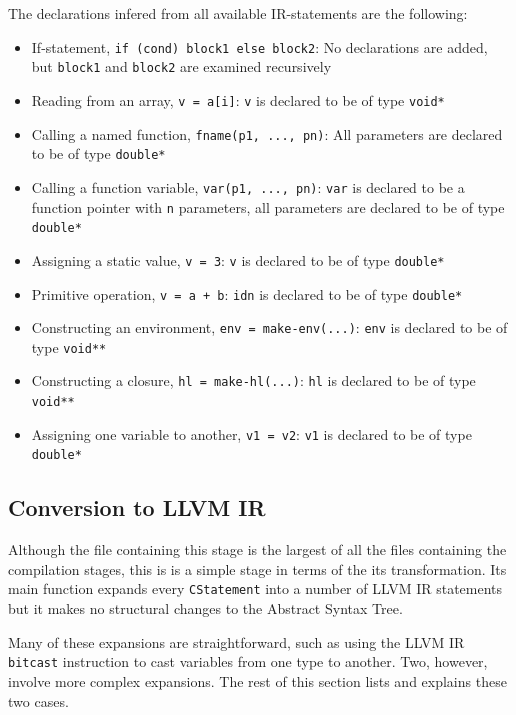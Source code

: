 \documentclass[11pt]{report}
\begin{document}
The declarations infered from all available IR-statements are the following:
\begin{itemize}
\item If-statement, \texttt{if (cond) block1 else block2}: No declarations are added, but \texttt{block1} and \texttt{block2} are examined recursively
\item Reading from an array, \texttt{v = a[i]}: \texttt{v} is declared to be of type \texttt{void*}
\item Calling a named function, \texttt{fname(p1, ..., pn)}: All parameters are declared to be of type \texttt{double*}
\item Calling a function variable, \texttt{var(p1, ..., pn)}: \texttt{var} is declared to be a function pointer with \texttt{n} parameters, all parameters are declared to be of type \texttt{double*}
\item Assigning a static value, \texttt{v = 3}: \texttt{v} is declared to be of type \texttt{double*}
\item Primitive operation, \texttt{v = a + b}: \texttt{idn} is declared to be of type \texttt{double*}
\item Constructing an environment, \texttt{env = make-env(...)}: \texttt{env} is declared to be of type \texttt{void**}
\item Constructing a closure, \texttt{hl = make-hl(...)}: \texttt{hl} is declared to be of type \texttt{void**}
\item Assigning one variable to another, \texttt{v1 = v2}: \texttt{v1} is declared to be of type \texttt{double*}
\end{itemize}

\subsection{Conversion to LLVM IR}

Although the file containing this stage is the largest of all the files containing the compilation stages, this is is a simple stage in terms of the its transformation. Its main function expands every \texttt{CStatement} into a number of LLVM IR statements but it makes no structural changes to the Abstract Syntax Tree.

Many of these expansions are straightforward, such as using the LLVM IR \texttt{bitcast} instruction to cast variables from one type to another. Two, however, involve more complex expansions. The rest of this section lists and explains these two cases.
\end{document}
